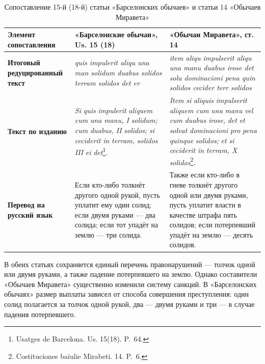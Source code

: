 \begin{center}
\small
\setlength{\tabcolsep}{2pt}
\begin{longtable}{|p{}|p{}|p{}|}
\caption{Сопоставление 15-й (18-й) статьи «Барселонских обычаев» и статьи 14 «Обычаев Миравета»}\label{tab:ch1-miravet}\\
\hline
\textbf{Элемент сопоставления} & \textbf{«Барселонские обычаи», }\textbf{ }\textbf{Us}\textbf{. }\textbf{15 (}\textbf{18}\textbf{)} & \textbf{«Обычаи }\textbf{Миравета}\textbf{», ст. 14} \\ \hline
\textbf{Итоговый редуцированный текст} & \emph{quis impulerit aliqu una man solidum duabus solidos terram solidos det er} & \emph{item aliqu impulserit aliqu una manu duabus irose det solu dominacioni pena quin solidos cecider terr solidos} \\ \hline
\textbf{Текст по изданию} & \emph{Si}\emph{ }\emph{quis}\emph{ }\emph{impulerit}\emph{ }\emph{aliquem}\emph{ }\emph{cum}\emph{ }\emph{una}\emph{ }\emph{manu}\emph{, I }\emph{solidum}\emph{; }\emph{cum}\emph{ }\emph{duabus}\emph{, II }\emph{solidos}\emph{; }\emph{si}\emph{ }\emph{ceciderit}\emph{ in }\emph{terram}\emph{, }\emph{solidos}\emph{ III }\emph{ei}\emph{ }\emph{det}\footnote{Usatges de Barcelona. Us. 15(18). P.~64.}\emph{.} & \emph{Item}\emph{ }\emph{si}\emph{ }\emph{aliquis}\emph{ }\emph{impulserit}\emph{ }\emph{aliquem}\emph{ }\emph{cum}\emph{ }\emph{una}\emph{ }\emph{manu}\emph{ }\emph{vel}\emph{ }\emph{cum}\emph{ }\emph{duabus}\emph{ }\emph{irose}\emph{, }\emph{det}\emph{ }\emph{et}\emph{ }\emph{solvat}\emph{ }\emph{dominacioni}\emph{ }\emph{pro}\emph{ }\emph{pena}\emph{ }\emph{quinque}\emph{ }\emph{solidos}\emph{; }\emph{et}\emph{ }\emph{si}\emph{ }\emph{ceciderit}\emph{ in }\emph{terram}\emph{, X }\emph{solidos}\footnote{Costituciones baiulie Mirabeti. 14. P.~6.}\emph{.} \\ \hline
\textbf{Перевод на русский язык} & Если кто-либо толкнёт другого одной рукой, пусть уплатит ему один солид; если двумя руками --- два солида; если тот упадёт на землю --- три солида. & Также если кто-либо в гневе толкнёт другого одной или двумя руками, пусть уплатит власти в качестве штрафа пять солидов; если потерпевший упадёт на землю --- десять солидов. \\ \hline
\end{longtable}
\end{center}

В обеих статьях сохраняется единый перечень правонарушений --- толчок одной или двумя руками, а также падение потерпевшего на землю. Однако составители «Обычаев Миравета» существенно изменили систему санкций. В «Барселонских обычаях» размер выплаты зависел от способа совершения преступления: один солид полагается за толчок одной рукой, два --- двумя руками и три --- в случае падения потерпевшего.

